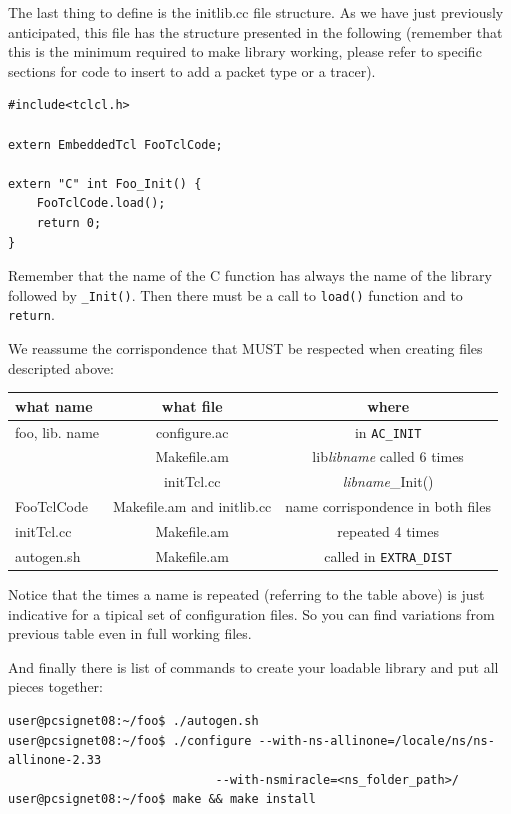 \documentclass[a4paper,10pt]{article}
\begin{document}
The last thing to define is the initlib.cc file structure. As we have just previously anticipated, this file has the structure presented in the following (remember that this is the minimum required to make library working, please refer to specific sections for code to insert to add a packet type or a tracer).

\begin{verbatim}
#include<tclcl.h>

extern EmbeddedTcl FooTclCode;

extern "C" int Foo_Init() {
	FooTclCode.load();
	return 0;
}
\end{verbatim}
Remember that the name of the C function has always the name of the library followed by \verb=_Init()=. Then there must be a call to \verb=load()= function and to \verb=return=.

We reassume the corrispondence that MUST be respected when creating files descripted above:

\vspace{1cm}
\begin{tabular}[c]{|l|c|c|}
\hline
what name & what file & where\\
\hline \hline
foo, lib. name & configure.ac & in \verb=AC_INIT=\\ \cline{2-3}
 & Makefile.am & lib\emph{libname} called 6 times\\ \cline{2-3}
 & initTcl.cc & \emph{libname}\_Init()\\
\hline
FooTclCode & Makefile.am and initlib.cc & name corrispondence in both files\\
\hline
initTcl.cc & Makefile.am & repeated 4 times\\
\hline
autogen.sh & Makefile.am & called in \verb=EXTRA_DIST=\\
\hline
\end{tabular}
\vspace{1cm}

Notice that the times a name is repeated (referring to the table above) is just indicative for a tipical set of configuration files. So you can find variations from previous table even in full working files.

And finally there is list of commands to create your loadable library and put all pieces together:
\begin{verbatim}
user@pcsignet08:~/foo$ ./autogen.sh
user@pcsignet08:~/foo$ ./configure --with-ns-allinone=/locale/ns/ns-allinone-2.33
                             --with-nsmiracle=<ns_folder_path>/
user@pcsignet08:~/foo$ make && make install
\end{verbatim}
\end{document}
